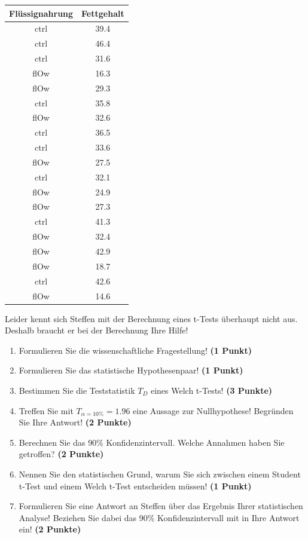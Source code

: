 \documentclass[a4paper, 9pt]{scrartcl}\usepackage[]{graphicx}\usepackage[]{xcolor}
\begin{document}
\begin{table}[!h]
\centering
\begin{tabular}{cc}
\toprule
Flüssignahrung & Fettgehalt\\
\midrule
ctrl & 39.4\\
ctrl & 46.4\\
ctrl & 31.6\\
flOw & 16.3\\
flOw & 29.3\\
\addlinespace
ctrl & 35.8\\
flOw & 32.6\\
ctrl & 36.5\\
ctrl & 33.6\\
flOw & 27.5\\
\addlinespace
ctrl & 32.1\\
flOw & 24.9\\
flOw & 27.3\\
ctrl & 41.3\\
flOw & 32.4\\
\addlinespace
flOw & 42.9\\
flOw & 18.7\\
ctrl & 42.6\\
flOw & 14.6\\
\bottomrule
\end{tabular}
\end{table}



Leider kennt sich Steffen mit der Berechnung eines t-Tests überhaupt nicht aus. Deshalb braucht er bei der Berechnung Ihre Hilfe!

\begin{enumerate}
  \item Formulieren Sie die wissenschaftliche Fragestellung! \textbf{(1 Punkt)}
  \item Formulieren Sie das statistische Hypothesenpaar! \textbf{(1 Punkt)}
  \item Bestimmen Sie die Teststatistik $T_{D}$ eines  Welch t-Tests! \textbf{(3 Punkte)}
  \item Treffen Sie mit $T_{\alpha = 10\%} = 1.96$ eine Aussage zur Nullhypothese! Begründen Sie Ihre Antwort! \textbf{(2 Punkte)}
\item Berechnen Sie das 90\% Konfidenzintervall. Welche Annahmen haben Sie getroffen? \textbf{(2 Punkte)}
\item Nennen Sie den statistischen Grund, warum Sie sich zwischen einem Student t-Test und einem Welch t-Test entscheiden müssen! \textbf{(1 Punkt)}
\item Formulieren Sie eine Antwort an Steffen über das Ergebnis Ihrer statistischen Analyse! Beziehen Sie dabei das 90\% Konfidenzintervall mit in Ihre Antwort ein! \textbf{(2 Punkte)}
\end{enumerate} 
\clearpage
\end{document}
